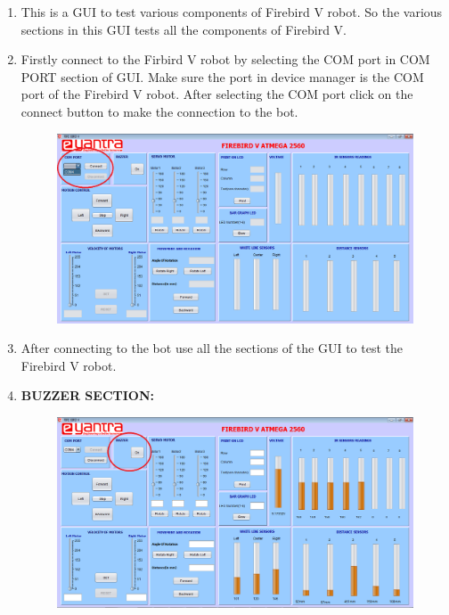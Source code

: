 \documentclass{article}
\begin{document}
\begin{enumerate}
\begin{figure}[h]
\begin{center}
			\end{center}
		\end{figure} 
		\newpage 
		\item This is a GUI to test various components of Firebird V robot. So the various sections in this GUI tests all the components of Firebird V.
		\item Firstly connect to the Firbird V robot by selecting the COM port in COM PORT section of GUI. Make sure the port in device manager is the COM port of the Firebird V robot. After selecting the COM port click on the connect button to make the connection to the bot. \\
		\begin{figure}[h]
			\begin{center}
				\includegraphics[scale=0.4]{comport.png}
			\end{center}
		\end{figure} 
		\item After connecting to the bot use all the sections of the GUI to test the Firebird V robot.
		\newpage
		\item \textbf{BUZZER SECTION:}\\
		\begin{figure}[h]
			\begin{center}
				\includegraphics[scale=0.4]{buzzer.png}

\end{center}
\end{figure}
\end{enumerate}
\end{document}
